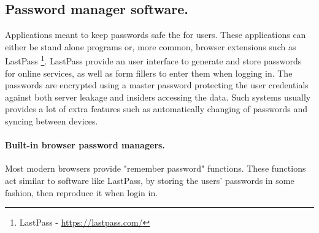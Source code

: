 \subsection{Password manager software.} \label{subsec:pms}
Applications meant to keep passwords safe the for users. These applications can either be stand alone programs or, more common, browser extensions such as LastPass \footnote{LastPass - \url{https://lastpass.com/}}. LastPass provide an user interface to generate and store passwords for online services, as well as form fillers to enter them when logging in. The passwords are encrypted using a master password protecting the user credentials against both server leakage and insiders accessing the data. Such systems usually provides a lot of extra features such as automatically changing of passwords and syncing between devices. 

\paragraph{Built-in browser password managers.} Most modern browsers provide "remember password" functions. These functions act similar to software like LastPass, by storing the users' passwords in some fashion, then reproduce it when login in. 

